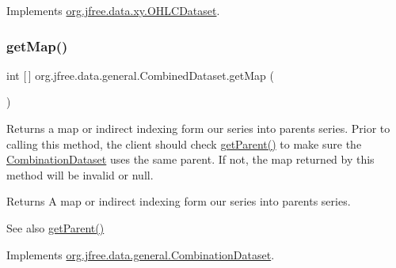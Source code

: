 Implements \mbox{\hyperlink{interfaceorg_1_1jfree_1_1data_1_1xy_1_1_o_h_l_c_dataset_a19a2a153a113ed4f82eedd596e94d1ed}{org.\+jfree.\+data.\+xy.\+O\+H\+L\+C\+Dataset}}.

\mbox{\label{classorg_1_1jfree_1_1data_1_1general_1_1_combined_dataset_a4e31368adeb280dd35e158ee9505e89b}} 
\subsubsection{\texorpdfstring{get\+Map()}{getMap()}}
{\footnotesize\ttfamily int \mbox{[}$\,$\mbox{]} org.\+jfree.\+data.\+general.\+Combined\+Dataset.\+get\+Map (\begin{DoxyParamCaption}{ }\end{DoxyParamCaption})}

Returns a map or indirect indexing form our series into parent\textquotesingle{}s series. Prior to calling this method, the client should check \mbox{\hyperlink{classorg_1_1jfree_1_1data_1_1general_1_1_combined_dataset_a75becba98ba679e1e4fbf9b36c77ac13}{get\+Parent()}} to make sure the \mbox{\hyperlink{interfaceorg_1_1jfree_1_1data_1_1general_1_1_combination_dataset}{Combination\+Dataset}} uses the same parent. If not, the map returned by this method will be invalid or null.

\begin{DoxyReturn}{Returns}
A map or indirect indexing form our series into parent\textquotesingle{}s series.
\end{DoxyReturn}
\begin{DoxySeeAlso}{See also}
\mbox{\hyperlink{classorg_1_1jfree_1_1data_1_1general_1_1_combined_dataset_a75becba98ba679e1e4fbf9b36c77ac13}{get\+Parent()}} 
\end{DoxySeeAlso}


Implements \mbox{\hyperlink{interfaceorg_1_1jfree_1_1data_1_1general_1_1_combination_dataset_a66aff831b2ae72a85d4485c56f8b0d21}{org.\+jfree.\+data.\+general.\+Combination\+Dataset}}.

\mbox{\label{classorg_1_1jfree_1_1data_1_1general_1_1_combined_dataset_a9113b1e7b51c716176aa3f8e954d0e7a}} 
